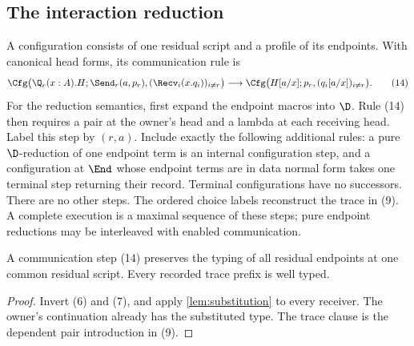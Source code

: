\subsection{The interaction reduction}

A configuration consists of one residual script and a profile of its
endpoints. With canonical head forms, its communication rule is
\[
 \Cfg\bigl(\Q_r(x:A).H;
       \Send_r(a,p_r),(\Recv_i(x.q_i))_{i\ne r}\bigr)
 \longrightarrow
 \Cfg\bigl(H[a/x];p_r,(q_i[a/x])_{i\ne r}\bigr).
 \tag{14}
\]
For the reduction semantics, first expand the endpoint macros into $\D$.
Rule (14) then requires a pair at the owner's head and a lambda at each
receiving head. Label this step by $(r,a)$. Include exactly the following
additional rules: a pure $\D$-reduction of one endpoint term is an internal
configuration step, and a configuration at $\End$ whose endpoint terms are
in data normal form takes one terminal step returning their record.
Terminal configurations have no successors. There are no other steps.
The ordered choice labels reconstruct the trace in (9). A complete execution
is a maximal sequence of these steps; pure endpoint reductions may be
interleaved with enabled communication.

\begin{corollary}
\label{cor:preservation}
A communication step (14) preserves the typing of all residual endpoints at
one common residual script. Every recorded trace prefix is well typed.
\end{corollary}
\begin{proof}
Invert (6) and (7), and apply \cref{lem:substitution} to every receiver. The
owner's continuation already has the substituted type. The trace clause is
the dependent pair introduction in (9).
\end{proof}

